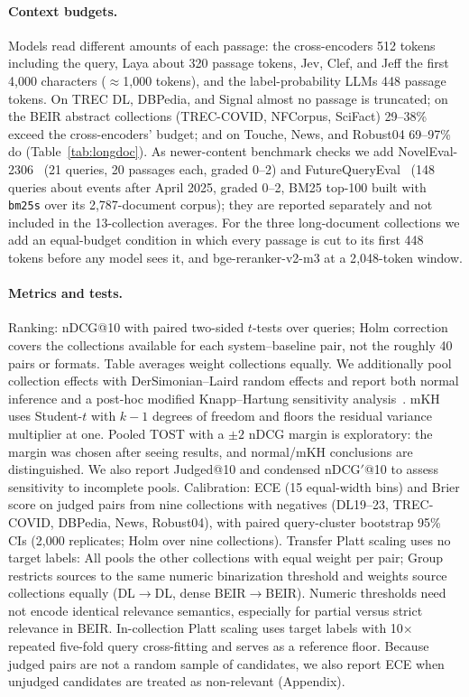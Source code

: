 \paragraph{Context budgets.}
Models read different amounts of each passage: the cross-encoders 512 tokens including the query, Laya about 320 passage tokens, Jev, Clef, and Jeff the first 4{,}000 characters ($\approx$1{,}000 tokens), and the label-probability LLMs 448 passage tokens.
On TREC DL, DBPedia, and Signal almost no passage is truncated; on the BEIR abstract collections (TREC-COVID, NFCorpus, SciFact) 29--38\% exceed the cross-encoders' budget; and on Touche, News, and Robust04 69--97\% do (Table~\ref{tab:longdoc}).
As newer-content benchmark checks we add NovelEval-2306~\cite{sun2023rankgpt} (21 queries, 20 passages each, graded 0--2) and FutureQueryEval~\cite{abdallah2025futurequery} (148 queries about events after April 2025, graded 0--2, BM25 top-100 built with \texttt{bm25s} over its 2{,}787-document corpus); they are reported separately and not included in the 13-collection averages.
For the three long-document collections we add an equal-budget condition in which every passage is cut to its first 448 tokens before any model sees it, and bge-reranker-v2-m3 at a 2{,}048-token window.

\paragraph{Metrics and tests.}
Ranking: nDCG@10 with paired two-sided $t$-tests over queries; Holm correction covers the collections available for each system--baseline pair, not the roughly 40 pairs or formats. Table averages weight collections equally. We additionally pool collection effects with DerSimonian--Laird random effects and report both normal inference and a post-hoc modified Knapp--Hartung sensitivity analysis~\cite{rover2015mkh}. mKH uses Student-$t$ with $k-1$ degrees of freedom and floors the residual variance multiplier at one. Pooled TOST with a $\pm2$ nDCG margin is exploratory: the margin was chosen after seeing results, and normal/mKH conclusions are distinguished. We also report Judged@10 and condensed nDCG$'$@10 to assess sensitivity to incomplete pools.
Calibration: ECE (15 equal-width bins) and Brier score on judged pairs from nine collections with negatives (DL19--23, TREC-COVID, DBPedia, News, Robust04), with paired query-cluster bootstrap 95\% CIs (2,000 replicates; Holm over nine collections). Transfer Platt scaling uses no target labels: All pools the other collections with equal weight per pair; Group restricts sources to the same numeric binarization threshold and weights source collections equally (DL$\to$DL, dense BEIR$\to$BEIR). Numeric thresholds need not encode identical relevance semantics, especially for partial versus strict relevance in BEIR. In-collection Platt scaling uses target labels with 10$\times$ repeated five-fold query cross-fitting and serves as a reference floor.
Because judged pairs are not a random sample of candidates, we also report ECE when unjudged candidates are treated as non-relevant (Appendix).

